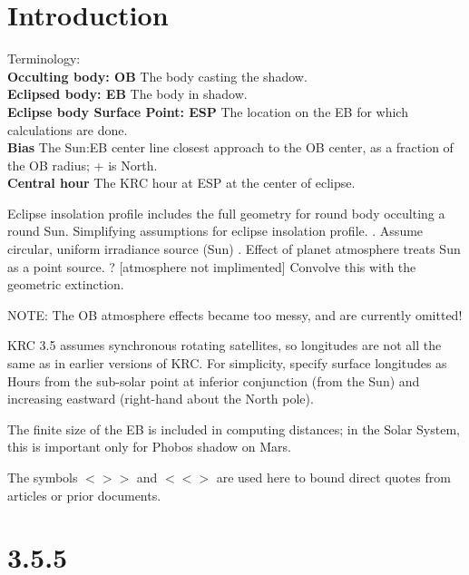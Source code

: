 \documentclass{article}
\newcommand{\bq}{$ < \! > \!   \! >$ } %
\newcommand{\eq}{ $< \! \! < \! > $ } %
\begin{document}

\section{Introduction}

Terminology: 
\\ \textbf{Occulting body: OB} The body casting the shadow.  %
\\ \textbf{Eclipsed body: EB} The body in shadow.  %
\\ \textbf{Eclipse body Surface Point: ESP} The location on the EB for which calculations are done. 
\\ \textbf{Bias} The Sun:EB center line closest approach to the OB center, as a fraction of the OB radius; + is North.
\\ \textbf{Central hour} The KRC hour at ESP at the center of eclipse.

Eclipse insolation profile includes the full geometry for round body occulting a round Sun. Simplifying assumptions for eclipse insolation profile.
. Assume circular, uniform irradiance source (Sun)
. Effect of planet atmosphere treats Sun as a point source. ? [atmosphere not implimented]
\qii  Convolve this with the geometric extinction.

NOTE: The OB atmosphere effects became too messy, and are currently omitted!

KRC 3.5 assumes synchronous rotating satellites, so longitudes are not all the
same as in earlier versions of KRC. For simplicity, specify surface longitudes
as Hours from the sub-solar point at inferior conjunction (from the Sun) and
increasing eastward (right-hand about the North pole).

The finite size of the EB is included in computing distances; in the Solar
System, this is important only for Phobos shadow on Mars.

The symbols \bq and \eq are used here to bound direct quotes from articles or
prior documents.

\section{3.5.5}
\end{document}
